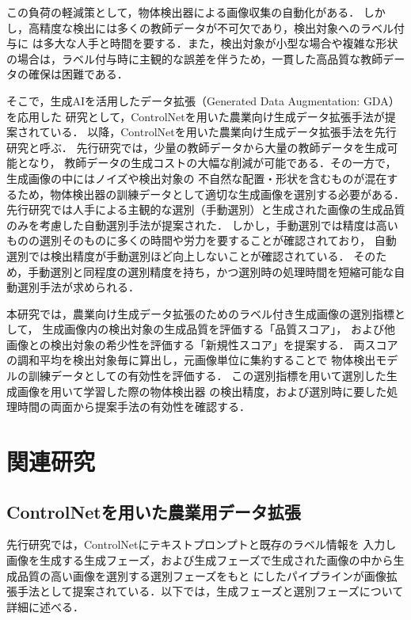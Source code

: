 \documentclass[Japanese]{dicomopapers}
\begin{document}
この負荷の軽減策として，物体検出器による画像収集の自動化がある\cite{qiao2022ai}\cite{sa2017weednet}．
しかし，高精度な検出には多くの教師データが不可欠であり，検出対象へのラベル付与に
は多大な人手と時間を要する．また，検出対象が小型な場合や複雑な形状の場合は，ラベル付与時に主観的な誤差を伴うため，一貫した高品質な教師データの確保は困難である．

そこで，生成AIを活用したデータ拡張（Generated Data Augmentation: GDA）\cite{zheng2023toward}を応用した
研究として，ControlNet\cite{zhang2023adding}を用いた農業向け生成データ拡張手法\cite{hirahara2025d4}が提案されている．
以降，ControlNetを用いた農業向け生成データ拡張手法を先行研究と呼ぶ．
先行研究では，少量の教師データから大量の教師データを生成可能となり，
教師データの生成コストの大幅な削減が可能である．その一方で，生成画像の中にはノイズや検出対象の
不自然な配置・形状を含むものが混在するため，物体検出器の訓練データとして適切な生成画像を選別する必要がある．
先行研究では人手による主観的な選別（手動選別）と生成された画像の生成品質のみを考慮した自動選別手法が提案された．
しかし，手動選別では精度は高いものの選別そのものに多くの時間や労力を要することが確認されており，
自動選別では検出精度が手動選別ほど向上しないことが確認されている．
そのため，手動選別と同程度の選別精度を持ち，かつ選別時の処理時間を短縮可能な自動選別手法が求められる．

本研究では，農業向け生成データ拡張のためのラベル付き生成画像の選別指標として，
生成画像内の検出対象の生成品質を評価する「品質スコア」，
および他画像との検出対象の希少性を評価する「新規性スコア」を提案する．
両スコアの調和平均を検出対象毎に算出し，元画像単位に集約することで
物体検出モデルの訓練データとしての有効性を評価する．
この選別指標を用いて選別した生成画像を用いて学習した際の物体検出器
の検出精度，および選別時に要した処理時間の両面から提案手法の有効性を確認する．
\section{関連研究}
  \subsection{ControlNetを用いた農業用データ拡張}

  先行研究では，ControlNetにテキストプロンプトと既存のラベル情報を
  入力し画像を生成する生成フェーズ，および生成フェーズで生成された画像の中から生成品質の高い画像を選別する選別フェーズをもと
  にしたパイプラインが画像拡張手法として提案されている．以下では，生成フェーズと選別フェーズについて詳細に述べる．
\end{document}
